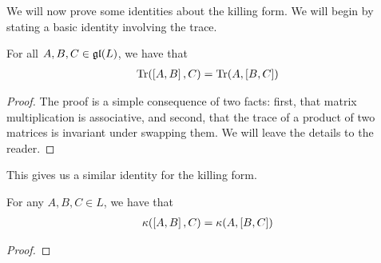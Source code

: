 \begin{comment}
Recall that we can assocate to any symmetric, bilinear form a symmetric matrix of it applied to any basis of a vector space. Denote
\begin{align}
    B := \begin{bmatrix}
        \kof{e_1, e_1} & \cdots & \kof{e_1, e_n} \\
        \vdots & \ddots & \vdots \\
        \kof{e_n, e_1} & \cdots & \kof{e_n, e_n}
    \end{bmatrix}
\end{align}
where $\set{e_1, \ldots, e_n}$ is a basis of $L$ and $n$ is its $\C$-dimension. Indeed, we can diagonalise $B$ by orthogonalising $\set{e_1, \ldots, e_n}$ with respect to $\kappa$ using the Gram-Schmidt process. Therefore, we may assume, without loss of generality, that $B$ is diagonal.
\end{comment}

We will now prove some identities about the killing form. We will begin by stating a basic identity involving the trace.

\begin{lemma}\label{Ch2:Lemma:TraceAssoc}
    For all $A, B, C \in \mathfrak{gl}\!\left( L \right)$, we have that
    \begin{align}
        \operatorname{Tr}\!\left( \left[ A, B \right], C \right) = \operatorname{Tr}\!\left( A, \left[ B, C \right] \right)
        \label{Ch2:Eq:TraceAssoc}
    \end{align}
\end{lemma}
\begin{proof}
    The proof is a simple consequence of two facts: first, that matrix multiplication is associative, and second, that the trace of a product of two matrices is invariant under swapping them. We will leave the details to the reader.
\end{proof}

This gives us a similar identity for the killing form.
\begin{boxcorollary}\label{Ch2:Cor:KillingAssoc}
    For any $A, B, C \in L$, we have that
    \begin{align}
        \kappa\!\left( \left[ A, B \right], C \right) = \kappa\!\left( A, \left[ B, C \right] \right)
        \label{Ch2:Eq:KillingAssoc}
    \end{align}
\end{boxcorollary}
\begin{proof}

    \sorry  %
\end{proof}

